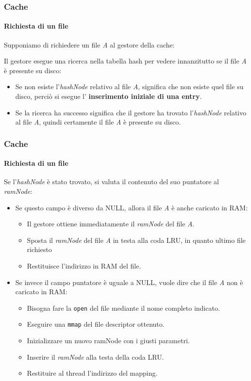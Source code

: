 \documentclass{beamer}
\begin{document}
\begin{frame}
\frametitle{Cache}
\framesubtitle{Richiesta di un file}

Supponiamo di richiedere un file \textit{A} al gestore della cache:
\medskip

Il gestore esegue una ricerca nella tabella hash per vedere innanzitutto se il file
\textit{A} è presente su disco:

\begin{itemize}
\item Se non esiste l'\textit{hashNode} relativo al file \textit{A}, significa che non esiste quel file
su disco, perciò si esegue l' \textbf{inserimento iniziale di una entry}.
\item Se la ricerca ha successo significa che il gestore ha trovato l'\textit{hashNode}
relativo al file \textit{A}, quindi certamente il file \textit{A} è presente su disco.
\end{itemize}


\end{frame}

\begin{frame}
\frametitle{Cache}
\framesubtitle{Richiesta di un file}
Se l’\textit{hashNode} è stato trovato, si valuta il contenuto del suo puntatore al \textit{ramNode}:

\begin{itemize}
\item Se questo campo è diverso da NULL, allora il file \textit{A} è anche caricato in
RAM:
\begin{itemize}
\item Il gestore ottiene immediatamente il \textit{ramNode} del file \textit{A}.
\item Sposta il \textit{ramNode} del file \textit{A} in testa alla coda LRU, in quanto ultimo file
richiesto
\item Restituisce l'indirizzo in RAM del file.
\end{itemize}
\item Se invece il campo puntatore è uguale a NULL, vuole dire che il file \textit{A} non è
caricato in RAM:
\begin{itemize}
\item Bisogna fare la \texttt{open} del file mediante il nome completo indicato.
\item Eseguire una \texttt{mmap} del file descriptor ottenuto.
\item Inizializzare un nuovo ramNode con i giusti parametri.
\item Inserire il \textit{ramNode} alla testa della coda LRU.
\item Restituire al thread l’indirizzo del mapping.
\end{itemize}
\end{itemize}

\end{frame}
\end{document}
